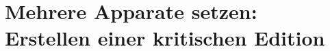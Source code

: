 
\chapter[Mehrere Apparate setzen: Erstellen einer kritischen Edition]{Mehrere Apparate setzen:\\Erstellen einer kritischen Edition}



 
\label{reledmac}


\newcommand\vari[3][]{%
\edtext{#2}{%
  \if$#1$\lemma{\gkk{#2}}\else\lemma{\gkk{#1}}\fi
  \Cfootnote{#3}}}

\newcommand\quell[3][]{%
\edtext{#2}{%
  \if$#1$\lemma{\gkk{#2}}\else\lemma{\gkk{#1}}\fi
  \Bfootnote{#3}}}

\newsavebox\bspbox
\newenvironment{reledmacbsp}[1]{%
  \begin{lrbox}{\bspbox}
  \begin{minipage}[t]{0.95\linewidth}
  \beginnumbering
  #1%
  \pstart[\subsubsection*{Strabons Geographika XIV 5,1}]%
}%
{%
  \pend
  \stopmsdata
  \endnumbering
  \end{minipage}%
  \end{lrbox}%
}

\newcommand\bsplineenum{\firstlinenum{2}\linenumincrement{2}}

\setcounter{alteSeite}{269}
\newcommand\alteSeite{{|\ledsidenote{\emph{T}~\thealteSeite}}}%

\newcommand\reledmac{\mbox{\Package{reledmac}}\xspace}
\newcommand\reledpar{\mbox{\Package{reledpar}}\xspace}

\VerbatimFootnotes
\DefineShortVerb{\+}

